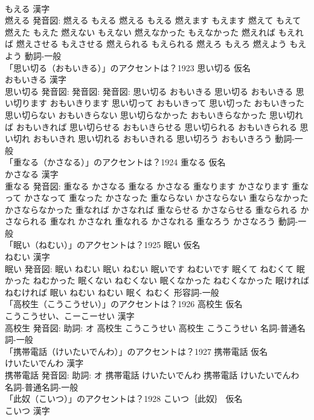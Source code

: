\documentclass[8pt]{extreport}
\begin{document}
\begin{CJK}{UTF8}{min}
\\	もえる 漢字　
\\	燃える 発音図:	燃える もえる		燃える もえる 燃えます もえます 燃えて もえて 燃えた もえた 燃えない もえない 燃えなかった もえなかった 燃えれば もえれば 燃えさせる もえさせる 燃えられる もえられる 燃えろ もえろ 燃えよう もえよう				動詞-一般 
\\	「思い切る（おもいきる）」のアクセントは？1923	思い切る 仮名　
\\	おもいきる 漢字　
\\	思い切る 発音図: 発音図: 発音図:	思い切る おもいきる		思い切る おもいきる 思い切ります おもいきります 思い切って おもいきって 思い切った おもいきった 思い切らない おもいきらない 思い切らなかった おもいきらなかった 思い切れば おもいきれば 思い切らせる おもいきらせる 思い切られる おもいきられる 思い切れ おもいきれ 思い切れる おもいきれる 思い切ろう おもいきろう				動詞-一般 
\\	「重なる（かさなる）」のアクセントは？1924	重なる 仮名　
\\	かさなる 漢字　
\\	重なる 発音図:	重なる かさなる		重なる かさなる 重なります かさなります 重なって かさなって 重なった かさなった 重ならない かさならない 重ならなかった かさならなかった 重なれば かさなれば 重ならせる かさならせる 重なられる かさなられる 重なれ かさなれ 重なれる かさなれる 重なろう かさなろう				動詞-一般 
\\	「眠い（ねむい）」のアクセントは？1925	眠い 仮名　
\\	ねむい 漢字　
\\	眠い 発音図:	眠い ねむい		眠い ねむい 眠いです ねむいです 眠くて ねむくて 眠かった ねむかった 眠くない ねむくない 眠くなかった ねむくなかった 眠ければ ねむければ 眠い ねむい ねむい 眠く ねむく				形容詞-一般 
\\	「高校生（こうこうせい）」のアクセントは？1926	高校生 仮名　
\\	こうこうせい、こーこーせい 漢字　
\\	高校生 発音図: 助詞: オ	高校生 こうこうせい		高校生 こうこうせい				名詞-普通名詞-一般 
\\	「携帯電話（けいたいでんわ）」のアクセントは？1927	携帯電話 仮名　
\\	けいたいでんわ 漢字　
\\	携帯電話 発音図: 助詞: オ	携帯電話 けいたいでんわ		携帯電話 けいたいでんわ				名詞-普通名詞-一般 
\\	「此奴（こいつ）」のアクセントは？1928	こいつ｛此奴｝ 仮名　
\\	こいつ 漢字　

\end{CJK}
\end{document}
